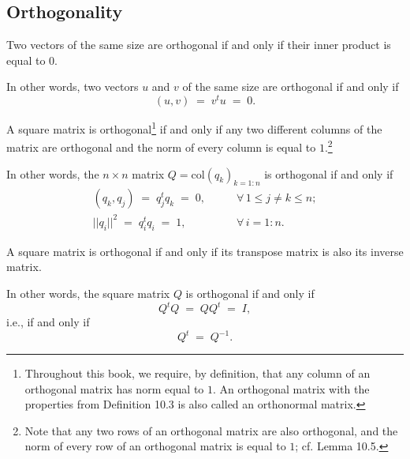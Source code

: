 \subsection{Orthogonality}

\begin{definition}
Two vectors of the same size are orthogonal if and only if their inner product is
equal to $0$.

In other words, two vectors $u$ and $v$ of the same size are orthogonal if and only if
\[
(u,v) \;=\; v^tu \;=\; 0.
\]
\end{definition}

\begin{definition}
A square matrix is orthogonal\footnote{Throughout this book, we require, by
definition, that any column of an orthogonal matrix has norm equal to $1$. An
orthogonal matrix with the properties from Definition 10.3 is also called an
orthonormal matrix.} if and only if any two different columns of the matrix are
orthogonal and the norm of every column is equal to $1$.\footnote{Note that any two
rows of an orthogonal matrix are also orthogonal, and the norm of every row of an
orthogonal matrix is equal to $1$; cf. Lemma 10.5.}

In other words, the $n \times n$ matrix $Q = \mathrm{col}(q_k)_{k=1:n}$ is orthogonal
if and only if
\begin{align}
(q_k,q_j) \;=\; q_j^tq_k \;=\; 0, &\qquad \forall\, 1 \le j \ne k \le n; \\
||q_i||^2 \;=\; q_i^tq_i \;=\; 1, &\qquad \forall\, i = 1:n.
\end{align}
\end{definition}

\begin{theorem}
A square matrix is orthogonal if and only if its transpose matrix is also its inverse
matrix.

In other words, the square matrix $Q$ is orthogonal if and only if
\begin{equation}
Q^tQ \;=\; QQ^t \;=\; I,
\end{equation}
i.e., if and only if
\begin{equation}
Q^t \;=\; Q^{-1}.
\end{equation}
\end{theorem}

